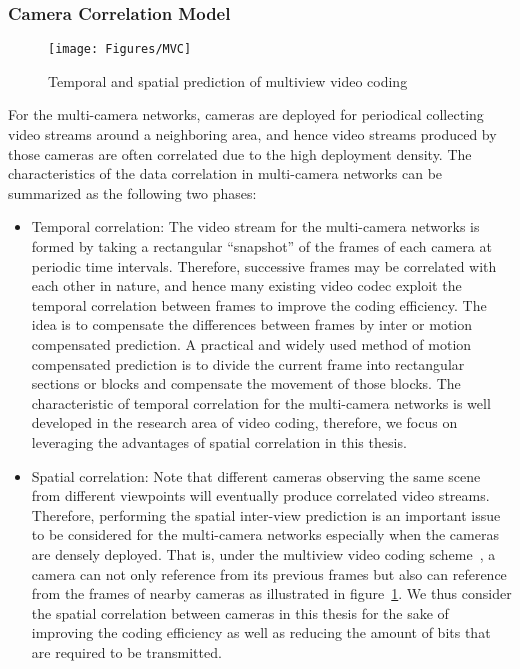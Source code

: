 \subsubsection{Camera Correlation Model}
%
\begin{figure}
\centering
\texttt{[image: Figures/MVC]}
\caption{Temporal and spatial prediction of multiview video coding~\cite{MVCoverview}\label{fig::MVC}}
\end{figure}
For the multi-camera networks, cameras are deployed for periodical collecting video streams around a neighboring area, and hence video streams produced by those cameras are often correlated due to the high deployment density.
The characteristics of the data correlation in multi-camera networks can be summarized as the following two phases:
\begin{itemize}
\item Temporal correlation: The video stream for the multi-camera networks is formed by taking a rectangular ``snapshot'' of the frames of each camera at periodic time intervals.
Therefore, successive frames may be correlated with each other in nature, and hence many existing video codec exploit the temporal correlation between frames to improve the coding efficiency.
The idea is to compensate the differences between frames by inter or motion compensated prediction.
A practical and widely used method of motion compensated prediction is to divide the current frame into rectangular sections or blocks and compensate the movement of those blocks.
The characteristic of temporal correlation for the multi-camera networks is well developed in the research area of video coding, therefore, we focus on leveraging the advantages of spatial correlation in this thesis.
\item Spatial correlation: Note that different cameras observing the same scene from different viewpoints will eventually produce correlated video streams.
Therefore, performing the spatial inter-view prediction is an important issue to be considered for the multi-camera networks especially when the cameras are densely deployed.
That is, under the multiview video coding scheme~\cite{MVCoverview}, a camera can not only reference from its previous frames but also can reference from the frames of nearby cameras as illustrated in figure~\ref{fig::MVC}.
We thus consider the spatial correlation between cameras in this thesis for the sake of improving the coding efficiency as well as reducing the amount of bits that are required to be transmitted.  
\end{itemize}
%

